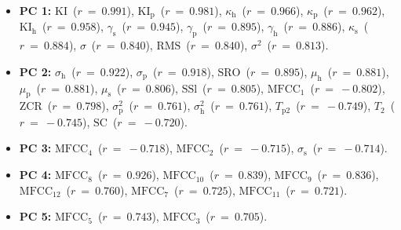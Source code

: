 \begin{itemize}
	\item {\bf{PC 1:}} $\textrm{KI}$~($r~=~0.991$), $\textrm{KI}_{\textrm{p}}$~($r~=~0.981$), $\kappa_{\textrm{h}}$~($r~=~0.966$), $\kappa_{\textrm{p}}$~($r~=~0.962$), $\textrm{KI}_{\textrm{h}}$~($r~=~0.958$), $\gamma_{\textrm{s}}$~($r~=~0.945$), $\gamma_{\textrm{p}}$~($r~=~0.895$), $\gamma_{\textrm{h}}$~($r~=~0.886$), $\kappa_{\textrm{s}}$~($r~=~0.884$), $\sigma$~($r~=~0.840$), $\textrm{RMS}$~($r~=~0.840$), $\sigma^{2}$~($r~=~0.813$).
	\item {\bf{PC 2:}} $\sigma_{\textrm{h}}$~($r~=~ 0.922$), $\sigma_{\textrm{p}}$~($r~=~ 0.918$), $\textrm{SRO}$~($r~=~ 0.895$), $\mu_{\textrm{h}}$~($r~=~ 0.881$), $\mu_{\textrm{p}}$~($r~=~ 0.881$), $\mu_{\textrm{s}}$~($r~=~ 0.806$), $\textrm{SSl}$~($r~=~ 0.805$), $\textrm{MFCC}_{1}$~($r~=~-0.802$), $\textrm{ZCR}$~($r~=~ 0.798$), $\sigma_{\textrm{p}}^{2}$~($r~=~ 0.761$), $\sigma_{\textrm{h}}^{2}$~($r~=~ 0.761$), $T_{\textrm{p}2}$~($r~=~-0.749$), $T_{2}$~($r~=~-0.745$), $\textrm{SC}$~($r~=~-0.720$).
	\item {\bf{PC 3:}} $\textrm{MFCC}_{4}$~($r~=~-0.718$), $\textrm{MFCC}_{2}$~($r~=~-0.715$), $\sigma_{\textrm{s}}$~($r~=~-0.714$).
	\item {\bf{PC 4:}} $\textrm{MFCC}_{8}$~($r~=~0.926$), $\textrm{MFCC}_{10}$~($r~=~0.839$), $\textrm{MFCC}_{9}$~($r~=~0.836$), $\textrm{MFCC}_{12}$~($r~=~0.760$), $\textrm{MFCC}_{7}$~($r~=~0.725$), $\textrm{MFCC}_{11}$~($r~=~0.721$).
	\item {\bf{PC 5:}} $\textrm{MFCC}_{5}$~($r~=~0.743$), $\textrm{MFCC}_{3}$~($r~=~0.705$).
\end{itemize}
